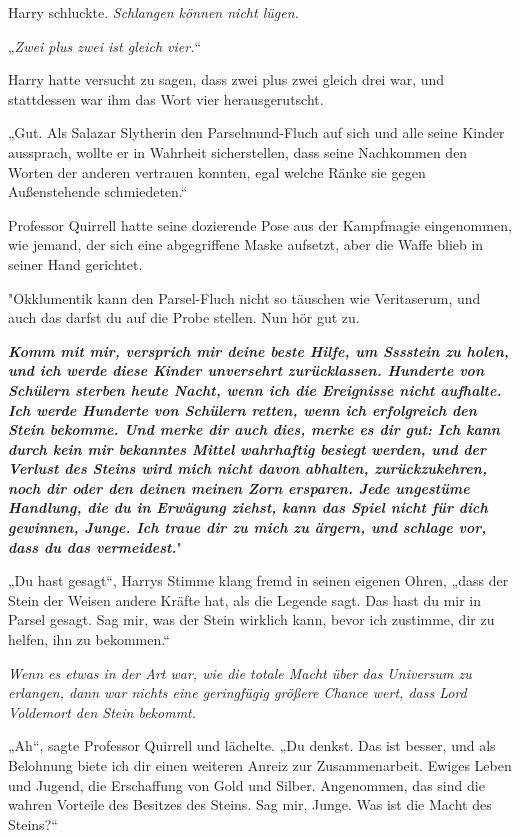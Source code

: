 {Harry schluckte. \emph{Schlangen können nicht lügen.}

„\emph{Zwei plus zwei ist gleich vier.}“

Harry hatte versucht zu sagen, dass zwei plus zwei gleich drei war, und stattdessen war ihm das Wort vier herausgerutscht.

„Gut. Als Salazar Slytherin den Parselmund-Fluch auf sich und alle seine Kinder aussprach, wollte er in Wahrheit sicherstellen, dass seine Nachkommen den Worten der anderen vertrauen konnten, egal welche Ränke sie gegen Außenstehende schmiedeten.“

Professor Quirrell hatte seine dozierende Pose aus der Kampfmagie eingenommen, wie jemand, der sich eine abgegriffene Maske aufsetzt, aber die Waffe blieb in seiner Hand gerichtet.

"Okklumentik kann den Parsel-Fluch nicht so täuschen wie Veritaserum, und auch das darfst du auf die Probe stellen. Nun hör gut zu.

\textbf{\emph{Komm mit mir, versprich mir deine beste Hilfe, um Sssstein zu holen, und ich werde diese Kinder unversehrt zurücklassen. Hunderte von Schülern sterben heute Nacht, wenn ich die Ereignisse nicht aufhalte. Ich werde Hunderte von Schülern retten, wenn ich erfolgreich den Stein bekomme. Und merke dir auch dies, merke es dir gut: Ich kann durch kein mir bekanntes Mittel wahrhaftig besiegt werden, und der Verlust des Steins wird mich nicht davon abhalten, zurückzukehren, noch dir oder den deinen meinen Zorn ersparen. Jede ungestüme Handlung, die du in Erwägung ziehst, kann das Spiel nicht für dich gewinnen, Junge. Ich traue dir zu mich zu ärgern, und schlage vor, dass du das vermeidest.}}"

„Du hast gesagt“, Harrys Stimme klang fremd in seinen eigenen Ohren, „dass der Stein der Weisen andere Kräfte hat, als die Legende sagt. Das hast du mir in Parsel gesagt. Sag mir, was der Stein wirklich kann, bevor ich zustimme, dir zu helfen, ihn zu bekommen.“

\emph{Wenn es etwas in der Art war, wie die totale Macht über das Universum zu erlangen, dann war nichts eine geringfügig größere Chance wert, dass Lord Voldemort den Stein bekommt.}

„Ah“, sagte Professor Quirrell und lächelte. „Du denkst. Das ist besser, und als Belohnung biete ich dir einen weiteren Anreiz zur Zusammenarbeit. Ewiges Leben und Jugend, die Erschaffung von Gold und Silber. Angenommen, das sind die wahren Vorteile des Besitzes des Steins. Sag mir, Junge. Was ist die Macht des Steins?“

}
